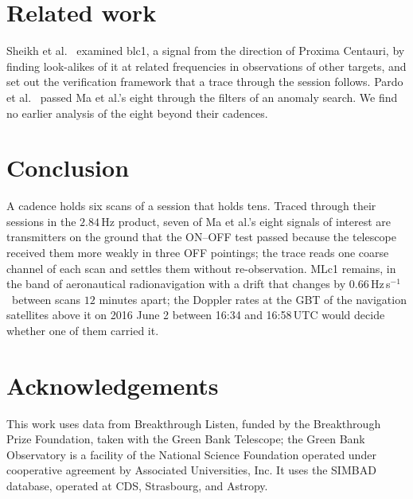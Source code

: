 \documentclass[3p,11pt]{elsarticle}
\newcommand{\hzs}{Hz\,s$^{-1}$}
\begin{document}
\section{Related work}\label{sec:related}

Sheikh et al.~\cite{Sheikh2021} examined blc1, a signal from the direction of Proxima Centauri, by finding look-alikes
of it at related frequencies in observations of other targets, and set out the verification framework that a trace
through the session follows. Pardo et al.~\cite{Pardo2025} passed Ma et al.'s eight through the filters of an anomaly
search. We find no earlier analysis of the eight beyond their cadences.

\section{Conclusion}\label{sec:conclusion}

A cadence holds six scans of a session that holds tens. Traced through their sessions in the $2.84$\,Hz product, seven
of Ma et al.'s eight signals of interest are transmitters on the ground that the ON--OFF test passed because the
telescope received them more weakly in three OFF pointings; the trace reads one coarse channel of each scan and
settles them without re-observation. MLc1 remains, in the band of aeronautical radionavigation with a drift that
changes by $0.66$\,\hzs\ between scans $12$ minutes apart; the Doppler rates at the GBT of the navigation satellites
above it on 2016 June 2 between 16:34 and 16:58\,UTC would decide whether one of them carried it.

\section*{Acknowledgements}

This work uses data from Breakthrough Listen, funded by the Breakthrough Prize Foundation, taken with the Green Bank
Telescope; the Green Bank Observatory is a facility of the National Science Foundation operated under cooperative
agreement by Associated Universities, Inc. It uses the SIMBAD database, operated at CDS, Strasbourg, and Astropy.
\end{document}
